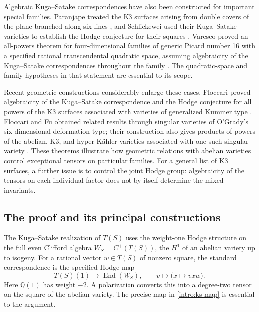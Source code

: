 \documentclass[11pt]{article}
\numberwithin{equation}{section}
\theoremstyle{definition}
\theoremstyle{remark}
\begin{document}
Algebraic Kuga--Satake correspondences have also been constructed for
important special families.  Paranjape treated the K3 surfaces arising
from double covers of the plane branched along six lines \cite{Paranjape},
and Schlickewei used their Kuga--Satake varieties to establish the Hodge
conjecture for their squares \cite[Theorem~2]{Schlickewei}.  Varesco proved an
all-powers theorem for four-dimensional families of generic Picard number
16 with a specified rational transcendental quadratic space, assuming
algebraicity of the Kuga--Satake correspondences throughout the family
\cite[Theorem~0.2]{VarescoPowers}.  The quadratic-space and family
hypotheses in that statement are essential to its scope.

Recent geometric constructions considerably enlarge these cases.
Floccari proved algebraicity of the Kuga--Satake correspondence and the
Hodge conjecture for all powers of the K3 surfaces associated with varieties
of generalized Kummer type \cite[Theorem~1.2]{FloccariKummer}.
Floccari and Fu obtained related results through singular varieties of
O'Grady's six-dimensional deformation type; their construction also gives
products of powers of the abelian, K3, and hyper-K\"ahler varieties
associated with one such singular variety
\cite[Theorem~5.7 and Corollary~5.8]{FloccariFu}.  These theorems illustrate
how geometric relations with abelian varieties control exceptional tensors
on particular families.  For a general list of K3 surfaces, a further
issue is to control the joint Hodge group: algebraicity of the tensors on
each individual factor does not by itself determine the mixed invariants.



\subsection{The proof and its principal constructions}

The Kuga--Satake realization of \(T(S)\) uses the
weight-one Hodge structure on the full even Clifford algebra
\(W_S=C^+(T(S))\), the \(H^1\) of an abelian variety up to isogeny.
For a rational vector \(w\in T(S)\) of nonzero square, the standard
correspondence is the specified Hodge map
\begin{equation}\label{intro:ks-map}
 T(S)(1)\longrightarrow\operatorname{End}(W_S),\qquad
 v\longmapsto\bigl(x\longmapsto vxw\bigr).
\end{equation}
Here \(\mathbb Q(1)\) has weight \(-2\).  A polarization converts this into
a degree-two tensor on the square of the abelian variety.
The precise map in \eqref{intro:ks-map} is essential to the argument.
\end{document}
